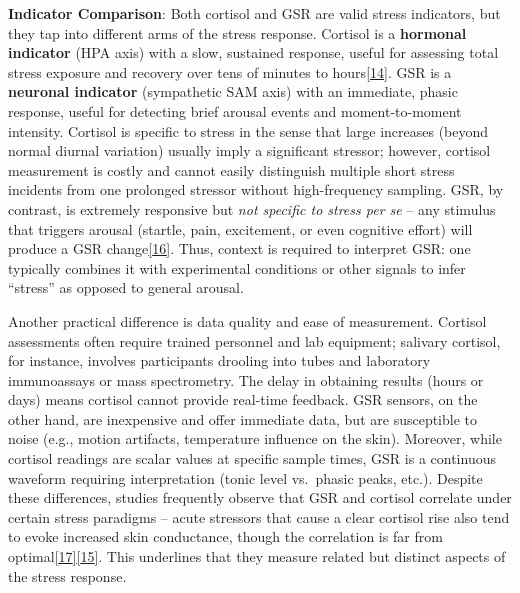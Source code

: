 \documentclass[12pt,a4paper]{article}
\begin{document}
\textbf{Indicator Comparison}: Both cortisol and GSR are valid stress indicators, but they tap into different arms of the stress response. Cortisol is a \textbf{hormonal indicator} (HPA axis) with a slow, sustained response, useful for assessing total stress exposure and recovery over tens of minutes to hours\href{https://www.frontiersin.org/journals/computer-science/articles/10.3389/fcomp.2020.00039/full\#:~:text=The\%20salivary\%20cortisol\%20response\%20\%28e,is\%20a\%20decay\%20time\%20constant}{{[}14{]}}. GSR is a \textbf{neuronal indicator} (sympathetic SAM axis) with an immediate, phasic response, useful for detecting brief arousal events and moment-to-moment intensity. Cortisol is specific to stress in the sense that large increases (beyond normal diurnal variation) usually imply a significant stressor; however, cortisol measurement is costly and cannot easily distinguish multiple short stress incidents from one prolonged stressor without high-frequency sampling. GSR, by contrast, is extremely responsive but \emph{not specific to stress per se} -- any stimulus that triggers arousal (startle, pain, excitement, or even cognitive effort) will produce a GSR change\href{Boucsein2012}{{[}16{]}}. Thus, context is required to interpret GSR: one typically combines it with experimental conditions or other signals to infer ``stress'' as opposed to general arousal.

Another practical difference is data quality and ease of measurement. Cortisol assessments often require trained personnel and lab equipment; salivary cortisol, for instance, involves participants drooling into tubes and laboratory immunoassays or mass spectrometry. The delay in obtaining results (hours or days) means cortisol cannot provide real-time feedback. GSR sensors, on the other hand, are inexpensive and offer immediate data, but are susceptible to noise (e.g., motion artifacts, temperature influence on the skin). Moreover, while cortisol readings are scalar values at specific sample times, GSR is a continuous waveform requiring interpretation (tonic level vs.~phasic peaks, etc.). Despite these differences, studies frequently observe that GSR and cortisol correlate under certain stress paradigms -- acute stressors that cause a clear cortisol rise also tend to evoke increased skin conductance, though the correlation is far from optimal\href{https://pubmed.ncbi.nlm.nih.gov/37514696/\#:~:text=regions\%20with\%20the\%20ANS\%20correlates,signals\%20significantly\%20varies\%20with\%20gender}{{[}17{]}}\href{https://www.frontiersin.org/journals/computer-science/articles/10.3389/fcomp.2020.00039/full\#:~:text=Since\%20psychological\%20stress\%20results\%20in,Poh\%20et}{{[}15{]}}. This underlines that they measure related but distinct aspects of the stress response.
\end{document}

